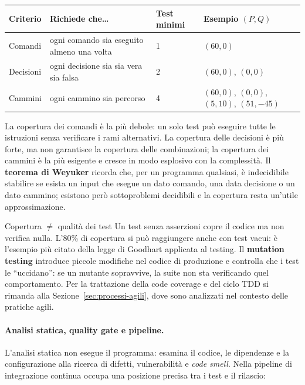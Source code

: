 \documentclass[12pt]{extarticle}
\begin{document}
\begin{center}
\small
\begin{tabular}{p{2.8cm}p{6.6cm}p{2.4cm}p{3.6cm}}
    \toprule
    \textbf{Criterio} & \textbf{Richiede che\dots} & \textbf{Test minimi} & \textbf{Esempio $(P,Q)$} \\
    \midrule
    Comandi & ogni comando sia eseguito almeno una volta & 1 & $(60,0)$ \\
    Decisioni & ogni decisione sia sia vera sia falsa & 2 & $(60,0)$, $(0,0)$ \\
    Cammini & ogni cammino sia percorso & 4 & $(60,0)$, $(0,0)$, $(5,10)$, $(51,-45)$ \\
    \bottomrule
\end{tabular}
\end{center}

\noindent La copertura dei comandi è la più debole: un solo test può eseguire tutte le istruzioni senza verificare i rami alternativi. La copertura delle decisioni è più forte, ma non garantisce la copertura delle combinazioni; la copertura dei cammini è la più esigente e cresce in modo esplosivo con la complessità. Il \textbf{teorema di Weyuker} ricorda che, per un programma qualsiasi, è indecidibile stabilire se esista un input che esegue un dato comando, una data decisione o un dato cammino; esistono però sottoproblemi decidibili e la copertura resta un'utile approssimazione.

\begin{cbox}{Copertura $\neq$ qualità dei test}
Un test senza asserzioni copre il codice ma non verifica nulla. L'80\% di copertura si può raggiungere anche con test vacui: è l'esempio più citato della legge di Goodhart applicata al testing. Il \textbf{mutation testing} introduce piccole modifiche nel codice di produzione e controlla che i test le ``uccidano'': se un mutante sopravvive, la suite non sta verificando quel comportamento. Per la trattazione della code coverage e del ciclo TDD si rimanda alla Sezione~\ref{sec:processi-agili}, dove sono analizzati nel contesto delle pratiche agili.
\end{cbox}

\paragraph{Analisi statica, quality gate e pipeline.}
L'analisi statica non esegue il programma: esamina il codice, le dipendenze e la configurazione alla ricerca di difetti, vulnerabilità e \textit{code smell}. Nella pipeline di integrazione continua occupa una posizione precisa tra i test e il rilascio:
\end{document}

